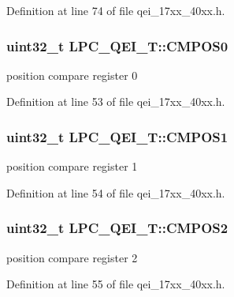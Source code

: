 Definition at line 74 of file qei\+\_\+17xx\+\_\+40xx.\+h.

\subsubsection[{\texorpdfstring{C\+M\+P\+O\+S0}{CMPOS0}}]{ uint32\+\_\+t L\+P\+C\+\_\+\+Q\+E\+I\+\_\+\+T\+::\+C\+M\+P\+O\+S0}\hypertarget{structLPC__QEI__T_a4bb72cc566919075cb721bb123e72443}{}\label{structLPC__QEI__T_a4bb72cc566919075cb721bb123e72443}
position compare register 0 

Definition at line 53 of file qei\+\_\+17xx\+\_\+40xx.\+h.

\subsubsection[{\texorpdfstring{C\+M\+P\+O\+S1}{CMPOS1}}]{ uint32\+\_\+t L\+P\+C\+\_\+\+Q\+E\+I\+\_\+\+T\+::\+C\+M\+P\+O\+S1}\hypertarget{structLPC__QEI__T_ad1272dc00c77777af8e58d6ac3b94902}{}\label{structLPC__QEI__T_ad1272dc00c77777af8e58d6ac3b94902}
position compare register 1 

Definition at line 54 of file qei\+\_\+17xx\+\_\+40xx.\+h.

\subsubsection[{\texorpdfstring{C\+M\+P\+O\+S2}{CMPOS2}}]{ uint32\+\_\+t L\+P\+C\+\_\+\+Q\+E\+I\+\_\+\+T\+::\+C\+M\+P\+O\+S2}\hypertarget{structLPC__QEI__T_aa2f3bddd189d57b8985ffca9ddb70ff2}{}\label{structLPC__QEI__T_aa2f3bddd189d57b8985ffca9ddb70ff2}
position compare register 2 

Definition at line 55 of file qei\+\_\+17xx\+\_\+40xx.\+h.

